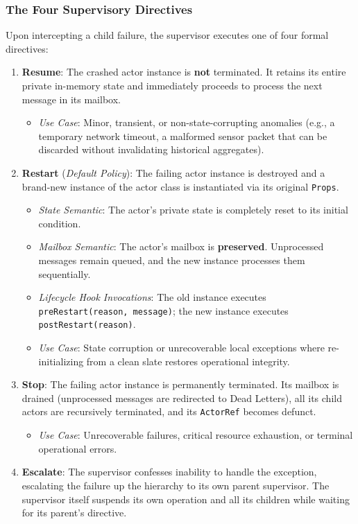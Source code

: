 \subsubsection{The Four Supervisory Directives}
Upon intercepting a child failure, the supervisor executes one of four formal directives:
\begin{enumerate}
    \item \textbf{Resume}: The crashed actor instance is \textbf{not} terminated. It retains its entire private in-memory state and immediately proceeds to process the next message in its mailbox.
    \begin{itemize}
        \item \textit{Use Case}: Minor, transient, or non-state-corrupting anomalies (e.g., a temporary network timeout, a malformed sensor packet that can be discarded without invalidating historical aggregates).
    \end{itemize}
    \item \textbf{Restart} (\textit{Default Policy}): The failing actor instance is destroyed and a brand-new instance of the actor class is instantiated via its original \texttt{Props}.
    \begin{itemize}
        \item \textit{State Semantic}: The actor's private state is completely reset to its initial condition.
        \item \textit{Mailbox Semantic}: The actor's mailbox is \textbf{preserved}. Unprocessed messages remain queued, and the new instance processes them sequentially.
        \item \textit{Lifecycle Hook Invocations}: The old instance executes \texttt{preRestart(reason, message)}; the new instance executes \texttt{postRestart(reason)}.
        \item \textit{Use Case}: State corruption or unrecoverable local exceptions where re-initializing from a clean slate restores operational integrity.
    \end{itemize}
    \item \textbf{Stop}: The failing actor instance is permanently terminated. Its mailbox is drained (unprocessed messages are redirected to Dead Letters), all its child actors are recursively terminated, and its \texttt{ActorRef} becomes defunct.
    \begin{itemize}
        \item \textit{Use Case}: Unrecoverable failures, critical resource exhaustion, or terminal operational errors.
    \end{itemize}
    \item \textbf{Escalate}: The supervisor confesses inability to handle the exception, escalating the failure up the hierarchy to its own parent supervisor. The supervisor itself suspends its own operation and all its children while waiting for its parent's directive.
\end{enumerate}

